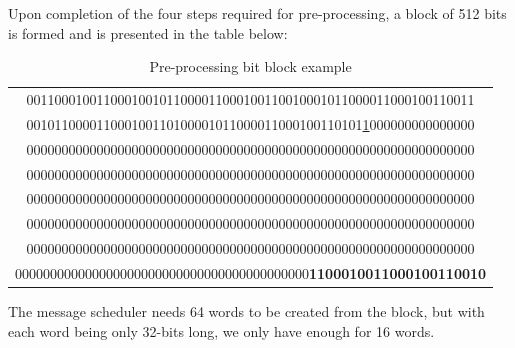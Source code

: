         Upon completion of the four steps required for pre-processing, a block of 512 bits is formed and is presented in the table below:
        \begin{table}[h!]
            
            \caption{Pre-processing bit block example}
            \label{tab:Pre-processing bit block example}
            \begin{center}
            \begin{tabular}{|c|}
             \hline  \rule{0pt}{4ex}   
             0011000100110001001011000011000100110010001011000011000100110011 \\
             001011000011000100110100001011000011000100110101\underline{1}000000000000000 \\
             0000000000000000000000000000000000000000000000000000000000000000 \\
             0000000000000000000000000000000000000000000000000000000000000000 \\
             0000000000000000000000000000000000000000000000000000000000000000 \\
             0000000000000000000000000000000000000000000000000000000000000000 \\
             0000000000000000000000000000000000000000000000000000000000000000 \\
             000000000000000000000000000000000000000000\textbf{1100010011000100110010} \\
             \hline
            \end{tabular}
            \end{center}
            
        \end{table}
        
        The message scheduler needs 64 words to be created from the block, but with each word being only 32-bits long, we only have enough for 16 words. 
        
